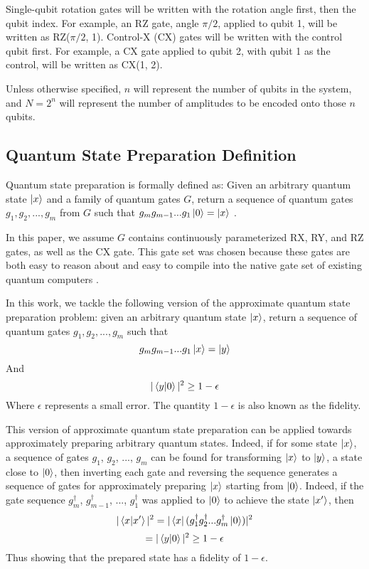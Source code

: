 \documentclass{article}
\begin{document}
Single-qubit rotation gates will be written with the rotation angle first, then
the qubit index. For example, an RZ gate, angle $\pi/2$, applied to qubit 1,
will be written as RZ($\pi/2$, 1). Control-X (CX) gates will be written with the
control qubit first. For example, a CX gate applied to qubit 2, with qubit 1 as
the control, will be written as CX(1, 2).

Unless otherwise specified, $n$ will represent the number of qubits in the
system, and $N = 2^n$ will represent the number of amplitudes to be encoded
onto those $n$ qubits.

\subsection{Quantum State Preparation Definition}
Quantum state preparation is formally defined as: Given an arbitrary quantum
state $\mathinner{|{x}\rangle}$ and a family of quantum gates $G$, return a sequence of quantum
gates $g_1, g_2, ..., g_m$ from $G$ such that 
$g_mg_{m-1} ... g_1\mathinner{|{0}\rangle} = \mathinner{|{x}\rangle}$ \cite{1629135}.

In this paper, we assume $G$ contains continuously parameterized RX, RY, and RZ
gates, as well as the CX gate. This gate set was chosen
because these gates are both easy to reason about and easy to compile into
the native gate set of existing quantum computers \cite{moro2021quantum}.

In this work, we tackle the following version of the approximate quantum state
preparation problem: given an arbitrary quantum state $\mathinner{|{x}\rangle}$, return a
sequence of quantum gates $g_1, g_2, ..., g_m$ such that
$$g_mg_{m-1} ... g_1\mathinner{|{x}\rangle} = \mathinner{|{y}\rangle}$$
And
$$|\mathinner{\langle{y|0}\rangle}|^2 \geq 1 - \epsilon$$
Where $\epsilon$ represents a small error. The quantity $1 - \epsilon$ is
also known as the fidelity.

This version of approximate quantum state preparation can be applied towards
approximately preparing arbitrary quantum states. Indeed, if for some state 
$\mathinner{|{x}\rangle}$, a sequence of gates $g_1$, $g_2$, ..., $g_m$ can be found for
transforming $\mathinner{|{x}\rangle}$ to $\mathinner{|{y}\rangle}$, a state close to $\mathinner{|{0}\rangle}$, then inverting
each gate and reversing the sequence generates a sequence of gates for 
approximately preparing $\mathinner{|{x}\rangle}$ starting from $\mathinner{|{0}\rangle}$.
Indeed, if the gate sequence $g_m^{\dagger}$, $g_{m - 1}^{\dagger}$, ..., 
$g_1^{\dagger}$ was applied to $\mathinner{|{0}\rangle}$ to achieve the state $\mathinner{|{x'}\rangle}$, then
$$|\mathinner{\langle{x|x'}\rangle}|^2 = |\mathinner{\langle{x}|}(g_1^{\dagger}g_2^{\dagger} ... g_m^{\dagger}\mathinner{|{0}\rangle})|^2$$
$$ = |\mathinner{\langle{y|0}\rangle}|^2 \geq 1 - \epsilon$$
Thus showing that the prepared state has a fidelity of $1 - \epsilon$.
\end{document}
